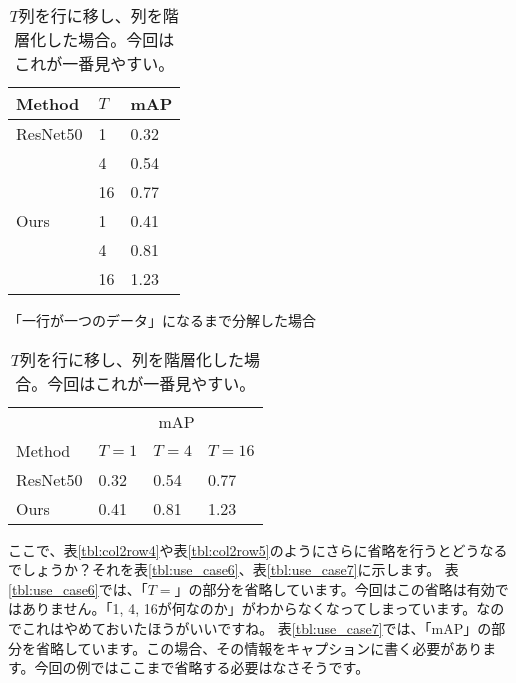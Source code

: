 \documentclass[uplatex,onecolumn,9pt,dvipdfmx]{jsarticle}
\newcommand{\Tref}[1]{表\ref{#1}}
\begin{document}
\begin{table}[h]
    \begin{minipage}{0.48\linewidth}
        \centering
        \begin{tabular}{@{}lll@{}} \toprule
            Method & $T$ & mAP \\ \midrule
            ResNet50 & 1  & 0.32 \\
                    & 4  & 0.54 \\
                    & 16 & 0.77 \\
            Ours     & 1  & 0.41 \\
                    & 4  & 0.81 \\
                    & 16 & 1.23 \\ \bottomrule   
        \end{tabular}
        \caption{「一行が一つのデータ」になるまで分解した場合}
        \label{tbl:use_case4}
    \end{minipage}
    \hfill
    \begin{minipage}{0.48\linewidth}
        \centering
        \begin{tabular}{@{}llll@{}} \toprule
            & \multicolumn{3}{c}{mAP} \\ \cmidrule(l){2-4}
            Method & $T=1$ & $T=4$ & $T=16$ \\ \midrule
            ResNet50  & 0.32 & 0.54 & 0.77 \\ 
            Ours      & 0.41 & 0.81 & 1.23 \\ \bottomrule   
        \end{tabular}
        \caption{$T$列を行に移し、列を階層化した場合。今回はこれが一番見やすい。}
        \label{tbl:use_case5}
    \end{minipage}
\end{table}

ここで、\Tref{tbl:col2row4}や\Tref{tbl:col2row5}のようにさらに省略を行うとどうなるでしょうか？それを\Tref{tbl:use_case6}、\Tref{tbl:use_case7}に示します。
\Tref{tbl:use_case6}では、「$T=$」の部分を省略しています。今回はこの省略は有効ではありません。「1, 4, 16が何なのか」がわからなくなってしまっています。なのでこれはやめておいたほうがいいですね。
\Tref{tbl:use_case7}では、「mAP」の部分を省略しています。この場合、その情報をキャプションに書く必要があります。今回の例ではここまで省略する必要はなさそうです。
\end{document}
